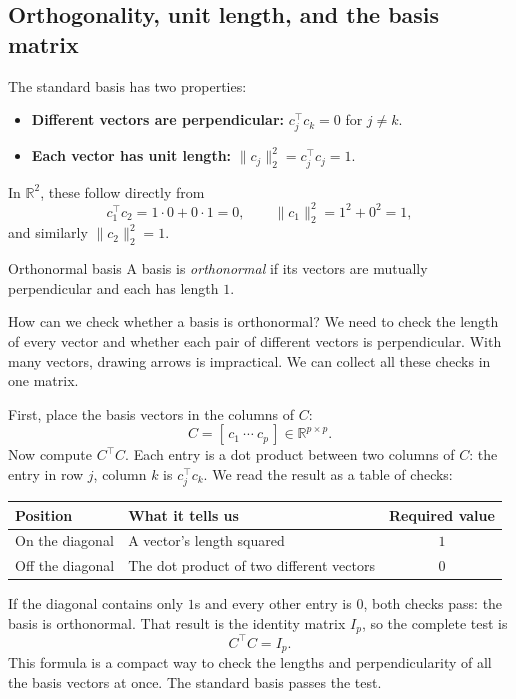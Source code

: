 \documentclass[a4paper,12pt,oneside]{report}
\begin{document}
\clearpage
\subsection{Orthogonality, unit length, and the basis matrix}

The standard basis has two properties:
\begin{itemize}
  \item \textbf{Different vectors are perpendicular:}
        $c_j^\top c_k=0$ for $j\ne k$.
  \item \textbf{Each vector has unit length:}
        $\lVert c_j\rVert_2^2=c_j^\top c_j=1$.
\end{itemize}
In $\mathbb{R}^{2}$, these follow directly from
\[
  c_1^\top c_2=1\cdot0+0\cdot1=0,\qquad
  \lVert c_1\rVert_2^2=1^2+0^2=1,
\]
and similarly $\lVert c_2\rVert_2^2=1$.

\begin{frameddefn}{Orthonormal basis}\label{def:orthonormal-basis}
A basis is \emph{orthonormal} if its vectors are mutually perpendicular
and each has length $1$.
\end{frameddefn}

How can we check whether a basis is orthonormal? We need to check the
length of every vector and whether each pair of different vectors is
perpendicular. With many vectors, drawing arrows is impractical. We
can collect all these checks in one matrix.

First, place the basis vectors in the columns of $C$:
\[
  C=[\,c_1\ \cdots\ c_p\,]
  \in\mathbb{R}^{p\times p}.
\]
Now compute $C^\top C$. Each entry is a dot product between two columns
of $C$: the entry in row $j$, column $k$ is $c_j^\top c_k$.
We read the result as a table of checks:
\begin{center}
\begin{tabularx}{\linewidth}{@{}lXc@{}}
\toprule
\textbf{Position} & \textbf{What it tells us} & \textbf{Required value} \\
\midrule
On the diagonal & A vector's length squared & $1$ \\
Off the diagonal & The dot product of two different vectors & $0$ \\
\bottomrule
\end{tabularx}
\end{center}

If the diagonal contains only $1$s and every other entry is $0$, both
checks pass: the basis is orthonormal. That result is the identity
matrix $I_p$, so the complete test is
\[
  \boxed{C^\top C=I_p.}
\]
This formula is a compact way to check the lengths and perpendicularity
of all the basis vectors at once. The standard basis passes the test.
\end{document}
